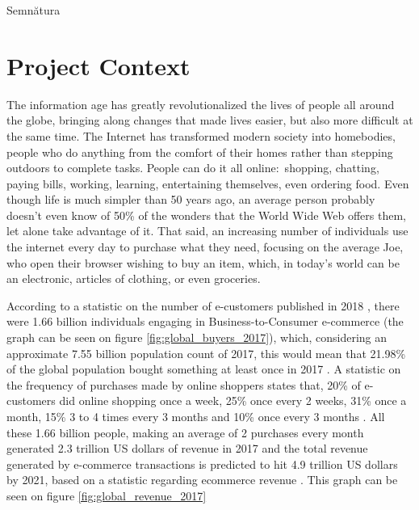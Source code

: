 \documentclass[12pt,a4paper,twoside]{report}
\begin{document}
\vspace{0.5cm}
\hspace{9.4cm}Semn\u{a}tura

\thispagestyle{empty}

\newpage

\tableofcontents
\newpage

\setcounter{page}{1}


\chapter{Project Context}
\pagestyle{headings}

The information age has greatly revolutionalized the lives of people all around the globe, bringing along changes that made lives easier, but also more difficult at the same time. The Internet has transformed modern society into homebodies, people who do anything from the comfort of their homes rather than stepping outdoors to complete tasks. People can do it all online: shopping, chatting, paying bills, working, learning, entertaining themselves, even ordering food. Even though life is much simpler than 50 years ago, an average person probably doesn't even know of 50\% of the wonders that the World Wide Web offers them, let alone take advantage of it. That said, an increasing number of individuals use the internet every day to purchase what they need, focusing on the average Joe, who open their browser wishing to buy an item, which, in today's world can be an electronic, articles of clothing, or even groceries.

According to a statistic on the number of e-customers published in 2018 \cite{global_buyers_2017}, there were 1.66 billion individuals engaging in Business-to-Consumer e-commerce (the graph can be seen on figure \ref{fig:global_buyers_2017}), which, considering an approximate 7.55 billion population count of 2017, this would mean that 21.98\% of the global population bought something at least once in 2017 . A statistic on the frequency of purchases made by online shoppers \cite{global_frequency_2018} states that, 20\% of e-customers did online shopping once a week, 25\% once every 2 weeks, 31\% once a month, 15\% 3 to 4 times every 3 months and 10\% once every 3 months . All these 1.66 billion people, making an average of 2 purchases every month generated 2.3 trillion US dollars of revenue in 2017 and the total revenue generated by e-commerce transactions is predicted to hit 4.9 trillion US dollars by 2021, based on a statistic regarding ecommerce revenue \cite{global_revenue_2017}. This graph can be seen on figure \ref{fig:global_revenue_2017}
\end{document}
